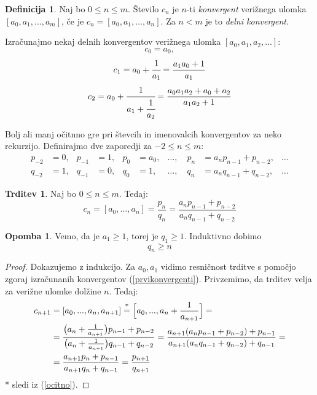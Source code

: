 \documentclass[a4paper,12pt]{article}
\newcommand{\equaltext}[1]{\ensuremath{\stackrel{\text{#1}}{=}}}
\theoremstyle{definition}
\newtheorem{df}{Definicija}[section]
\theoremstyle{proposition}
\newtheorem{trd}{Trditev}[section]
\theoremstyle{theorem}
\theoremstyle{lemma}
\newtheorem*{op}{Opomba}
\begin{document}
\begin{df}
Naj bo $0 \leq n \leq m$. Število $c_n$ je $n$-ti \textit{konvergent} 		verižnega ulomka $[a_0, a_1, ..., a_m]$, če je $c_n = [a_0, a_1, ..., a_n]$. Za $n < m$ je to \textit{delni konvergent}.
\end{df}

Izračunajmo nekaj delnih konvergentov verižnega ulomka $[a_0, a_1, a_2, ...]$: 
\begin{equation*}
c_0=a_0,
\end{equation*}
\begin{equation}
\label{prvikonvergenti}
c_1=a_0+\cfrac{1}{a_1}=\frac{a_1 a_0 + 1}{a_1}
\end{equation}
\begin{equation*}
c_2 = a_0 + \cfrac{1}{a_1 + \cfrac{1}{a_2}} =\frac{a_0 a_1 a_2 + a_0 + a_2}{a_1 a_2 + 1}
\end{equation*}

Bolj ali manj očitnno gre pri števcih in imenovalcih konvergentov za neko rekurzijo. Definirajmo dve zaporedji za $-2\leq n \leq m$:
\begin{align*}
		p_{-2} &= 0, & p_{-1} &= 1, & p_0 &= a_0, & \dots, \quad p_n &= a_{n}p_{n-1} + p_{n-2}, & \dots \\
		q_{-2} &= 1, & q_{-1} &= 0, & q_0 &= 1, & \dots, \quad q_n &= a_{n}q_{n-1} + q_{n-2}, & \dots
\end{align*}
		
\begin{trd}
Naj bo $0\leq n \leq m$. Tedaj:
\begin{equation}
\label{pninqn}
c_n = [a_0, ..., a_n] = \frac{p_n}{q_n} = \frac{a_{n}p_{n-1} + p_{n-2}}{a_{n}q_{n-1} + q_{n-2}}
\end{equation}
\end{trd}

\begin{op}
Vemo, da je $a_1 \geq 1$, torej je $q_1 \geq 1$. Induktivno dobimo
\begin{equation}
\label{ocenaimenovalca}
q_n \geq n
\end{equation}
\end{op}

\begin{proof}
Dokazujemo z indukcijo. Za $a_0, a_1$ vidimo resničnost trditve s pomočjo zgoraj izračunanih konvergentov (\ref{prvikonvergenti}). Privzemimo, da trditev velja za verižne ulomke dolžine $n$. Tedaj:
\begin{equation*}
\begin{split}
c_{n+1}&=[a_0, ...,a_n, a_{n+1}]
\equaltext{\text{*}}{} \Big[a_0, ..., a_n + \frac{1}{a_{n+1}}\Big] =\\
&= \frac{\big(a_n + \frac{1}{a_{n+1}}\big)p_{n-1}+p_{n-2}}{\big(a_n + \frac{1}{a_{n+1}}\big)q_{n-1}+q_{n-2}} =
\frac{a_{n+1}(a_n p_{n-1} + p_{n-2}) + p_{n-1}}{a_{n+1}(a_n q_{n-1} + q_{n-2}) + q_{n-1}} =\\
&=\frac{a_{n+1}p_n + p_{n-1}}{a_{n+1}q_n + q_{n-1}} = \frac{p_{n+1}}{q_{n+1}}
\end{split}
\end{equation*}
* sledi iz (\ref{ocitno}).
\end{proof}
\end{document}
